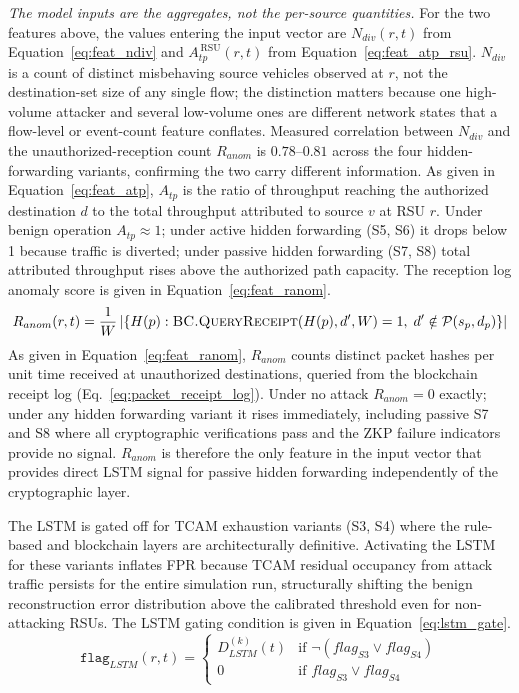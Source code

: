 \documentclass[12pt, a4paper]{report}
\begin{document}
\textit{The model inputs are the aggregates, not the per-source quantities.}
For the two features above, the values entering the input vector are
$N_{div}(r,t)$ from Equation~\eqref{eq:feat_ndiv} and
$A_{tp}^{\,\mathrm{RSU}}(r,t)$ from Equation~\eqref{eq:feat_atp_rsu}.
$N_{div}$ is a count of distinct misbehaving source vehicles observed at $r$,
not the destination-set size of any single flow; the distinction matters because
one high-volume attacker and several low-volume ones are different network
states that a flow-level or event-count feature conflates. Measured correlation
between $N_{div}$ and the unauthorized-reception count $R_{anom}$ is
$0.78$--$0.81$ across the four hidden-forwarding variants, confirming the two
carry different information.
As given in Equation~\eqref{eq:feat_atp},
$A_{tp}$ is the ratio of throughput reaching the
authorized destination $d$ to the total throughput
attributed to source $v$ at \ac{RSU} $r$. Under
benign operation $A_{tp}{\approx}1$; under active
hidden forwarding (S5, S6) it drops below 1 because
traffic is diverted; under passive hidden forwarding
(S7, S8) total attributed throughput rises above the
authorized path capacity. The reception log anomaly
score is given in Equation~\eqref{eq:feat_ranom}.
\begin{equation}
R_{anom}(r,t) =
\frac{1}{W}\left|\left\{
H(p) :
\textsc{BC.QueryReceipt}(H(p),d',W) = 1,\;
d' \notin \mathcal{P}(s_p, d_p)
\right\}\right|
\label{eq:feat_ranom}
\end{equation}
As given in Equation~\eqref{eq:feat_ranom},
$R_{anom}$ counts distinct packet hashes per unit
time received at unauthorized destinations, queried
from the blockchain receipt log
(Eq.~\ref{eq:packet_receipt_log}). Under no attack
$R_{anom}{=}0$ exactly; under any hidden forwarding
variant it rises immediately, including passive S7
and S8 where all cryptographic verifications pass
and the \ac{ZKP} failure indicators provide no
signal. $R_{anom}$ is therefore the only feature in
the input vector that provides direct LSTM signal
for passive hidden forwarding independently of the
cryptographic layer.

The \ac{LSTM} is gated off for \ac{TCAM} exhaustion
variants (S3, S4) where the rule-based and blockchain
layers are architecturally definitive. Activating the
\ac{LSTM} for these variants inflates \ac{FPR} because
\ac{TCAM} residual occupancy from attack traffic
persists for the entire simulation run, structurally
shifting the benign reconstruction error distribution
above the calibrated threshold even for non-attacking
\ac{RSU}s. The \ac{LSTM} gating condition is given in
Equation~\eqref{eq:lstm_gate}.
\begin{equation}
\texttt{flag}_{LSTM}(r,t) =
\begin{cases}
D_{LSTM}^{(k)}(t) &
\text{if } \neg(flag_{S3} \lor flag_{S4}) \\
0 &
\text{if } flag_{S3} \lor flag_{S4}
\end{cases}
\label{eq:lstm_gate}
\end{equation}
\end{document}
